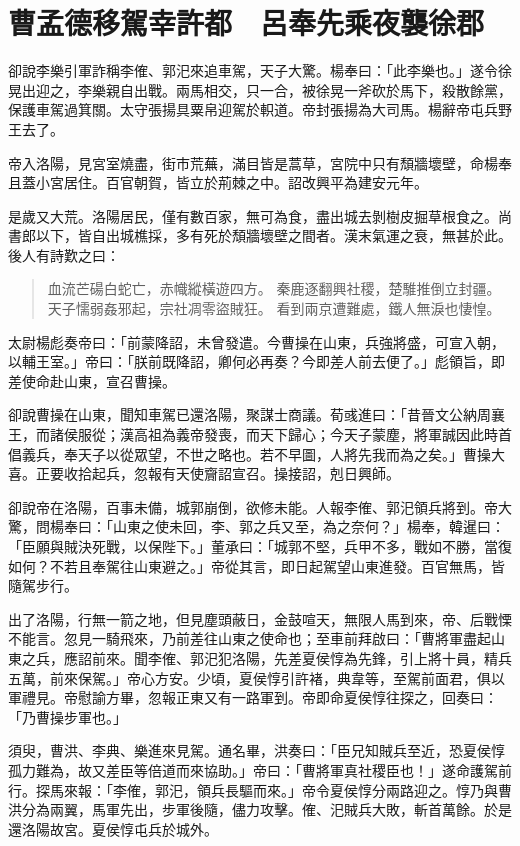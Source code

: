 
\chapter{曹孟德移駕幸許都　呂奉先乘夜襲徐郡}

卻說李樂引軍詐稱李傕、郭汜來追車駕，天子大驚。楊奉曰：「此李樂也。」遂令徐晃出迎之，李樂親自出戰。兩馬相交，只一合，被徐晃一斧砍於馬下，殺散餘黨，保護車駕過箕關。太守張揚具粟帛迎駕於軹道。帝封張揚為大司馬。楊辭帝屯兵野王去了。

帝入洛陽，見宮室燒盡，街市荒蕪，滿目皆是蒿草，宮院中只有頹牆壞壁，命楊奉且蓋小宮居住。百官朝賀，皆立於荊棘之中。詔改興平為建安元年。

是歲又大荒。洛陽居民，僅有數百家，無可為食，盡出城去剝樹皮掘草根食之。尚書郎以下，皆自出城樵採，多有死於頹牆壞壁之間者。漢末氣運之衰，無甚於此。後人有詩歎之曰：

\begin{quote}
血流芒碭白蛇亡，赤幟縱橫遊四方。
秦鹿逐翻興社稷，楚騅推倒立封疆。
天子懦弱姦邪起，宗社凋零盜賊狂。
看到兩京遭難處，鐵人無淚也悽惶。
\end{quote}

太尉楊彪奏帝曰：「前蒙降詔，未曾發遣。今曹操在山東，兵強將盛，可宣入朝，以輔王室。」帝曰：「朕前既降詔，卿何必再奏？今即差人前去便了。」彪領旨，即差使命赴山東，宣召曹操。

卻說曹操在山東，聞知車駕已還洛陽，聚謀士商議。荀彧進曰：「昔晉文公納周襄王，而諸侯服從；漢高祖為義帝發喪，而天下歸心；今天子蒙塵，將軍誠因此時首倡義兵，奉天子以從眾望，不世之略也。若不早圖，人將先我而為之矣。」曹操大喜。正要收拾起兵，忽報有天使齎詔宣召。操接詔，剋日興師。

卻說帝在洛陽，百事未備，城郭崩倒，欲修未能。人報李傕、郭汜領兵將到。帝大驚，問楊奉曰：「山東之使未回，李、郭之兵又至，為之奈何？」楊奉，韓暹曰：「臣願與賊決死戰，以保陛下。」董承曰：「城郭不堅，兵甲不多，戰如不勝，當復如何？不若且奉駕往山東避之。」帝從其言，即日起駕望山東進發。百官無馬，皆隨駕步行。

出了洛陽，行無一箭之地，但見塵頭蔽日，金鼓喧天，無限人馬到來，帝、后戰慄不能言。忽見一騎飛來，乃前差往山東之使命也；至車前拜啟曰：「曹將軍盡起山東之兵，應詔前來。聞李傕、郭汜犯洛陽，先差夏侯惇為先鋒，引上將十員，精兵五萬，前來保駕。」帝心方安。少頃，夏侯惇引許褚，典韋等，至駕前面君，俱以軍禮見。帝慰諭方畢，忽報正東又有一路軍到。帝即命夏侯惇往探之，回奏曰：「乃曹操步軍也。」

須臾，曹洪、李典、樂進來見駕。通名畢，洪奏曰：「臣兄知賊兵至近，恐夏侯惇孤力難為，故又差臣等倍道而來協助。」帝曰：「曹將軍真社稷臣也！」遂命護駕前行。探馬來報：「李傕，郭汜，領兵長驅而來。」帝令夏侯惇分兩路迎之。惇乃與曹洪分為兩翼，馬軍先出，步軍後隨，儘力攻擊。傕、汜賊兵大敗，斬首萬餘。於是還洛陽故宮。夏侯惇屯兵於城外。

